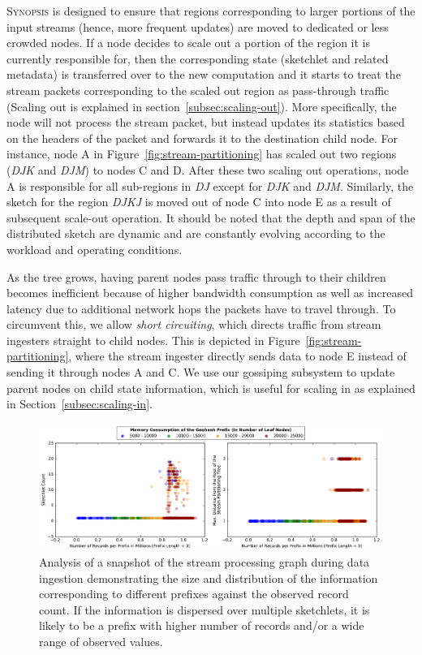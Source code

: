 \textsc{Synopsis} is designed to ensure that regions corresponding to larger portions of the input streams (hence, more frequent updates) are moved to dedicated or less crowded nodes.
If a node decides to scale out a portion of the region it is currently responsible for, then the corresponding state (sketchlet and related metadata) is transferred over to the new computation and it starts to treat the stream packets corresponding to the scaled out region as pass-through traffic (Scaling out is explained in section~\ref{subsec:scaling-out}).
More specifically, the node will not process the stream packet, but instead updates its statistics based on the headers of the packet and forwards it to the destination child node. 
For instance, node A in Figure~\ref{fig:stream-partitioning} has scaled out two regions (\emph{DJK} and \emph{DJM}) to nodes C and D.
After these two scaling out operations, node A is responsible for all sub-regions in \emph{DJ} except for \emph{DJK} and \emph{DJM}.
Similarly, the sketch for the region \emph{DJKJ} is moved out of node C into node E as a result of subsequent scale-out operation.
It should be noted that the depth and span of the distributed sketch are dynamic and are constantly evolving according to the workload and operating conditions.

As the tree grows, having parent nodes pass traffic through to their children becomes inefficient because of higher bandwidth consumption as well as increased latency due to additional network hops the packets have to travel through.
To circumvent this, we allow \emph{short circuiting}, which directs traffic from stream ingesters straight to child nodes.
This is depicted in Figure~\ref{fig:stream-partitioning}, where the stream ingester directly sends data to node E instead of sending it through nodes A and C.
We use our gossiping subsystem to update parent nodes on child state information, which is useful for scaling in as explained in Section~\ref{subsec:scaling-in}.
\begin{figure}[t!]
    \centerline{\includegraphics[width=\linewidth]{figures/scaleout_graph_analysis.pdf}}
    \caption{Analysis of a snapshot of the stream processing graph during data ingestion demonstrating the size and distribution of the information corresponding to different prefixes against the observed record count. If the information is dispersed over multiple sketchlets, it is likely to be a prefix with higher number of records and/or a wide range of observed values.}
    \label{fig:scaleout-graph-analysis}
\end{figure}
%

